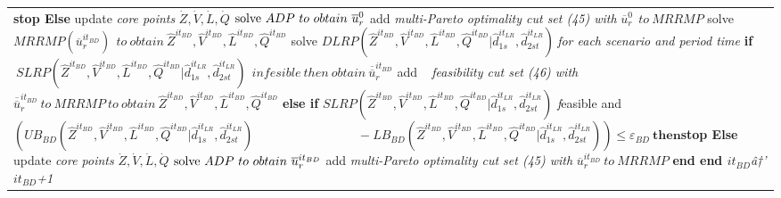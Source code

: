 \documentclass[review]{elsarticle}
\begin{document}
\begin{scriptsize}
\begin{tabular}{p{4.9in}}
 \textbf{         stop\textit{\newline }       Else\newline }          update\textit{ core points }$\dot{Z},\dot{V},\dot{L},\dot{Q}$\newline 
         ${\rm solve}\ ADP\ to\ obtain\ {\overline{u}}^0_r$\textbf{\textit{\newline }}\textit{         }add\textit{ multi-Pareto optimality cut set (45) with }${\overline{u}}^0_r\ \ to\ MRRMP$\newline \textbf{         }solve $MRRMP({\overline{u}}^{{it}_{BD}}_r)\ \ to\ obtain\ {\hat{Z}}^{{it}_{BD}},{\hat{V}}^{it_{BD}},{\hat{L}}^{it_{BD}},{\hat{Q}}^{it_{BD}}$\newline \textbf{         }solve $DLRP\left({\hat{Z}}^{{it}_{BD}},{\hat{V}}^{it_{BD}},{\hat{L}}^{it_{BD}},{\hat{Q}}^{it_{BD}}|{\hat{d}}^{{it}_{LR}}_{1s},{\hat{d}}^{it_{LR}}_{2st}\right)\ $\textit{for each scenario and period time}\newline 
          \textbf{   if} $\ SLRP\left({\hat{Z}}^{{it}_{BD}},{\hat{V}}^{it_{BD}},{\hat{L}}^{it_{BD}},{\hat{Q}}^{it_{BD}}|{\hat{d}}^{{it}_{LR}}_{1s},{\hat{d}}^{it_{LR}}_{2st}\right)\ \ infesible\ then\ obtain\ {\overline{\overline{u}}}^{it_{BD}}_r$
           \newline       
        add \ \textit{ feasibility cut set (46) with }${\overline{\overline{u}}}^{it_{BD}}_r\ to\ MRRMP\ to\ obtain\ {\hat{Z}}^{{it}_{BD}},{\hat{V}}^{it_{BD}},{\hat{L}}^{it_{BD}},{\hat{Q}}^{it_{BD}}$\newline
         \textbf{  else if} $SLRP\left({\hat{Z}}^{{it}_{BD}},{\hat{V}}^{it_{BD}},{\hat{L}}^{it_{BD}},{\hat{Q}}^{it_{BD}}|{\hat{d}}^{{it}_{LR}}_{1s},{\hat{d}}^{it_{LR}}_{2st}\right)$ {\textit feasible and } \newline 
          $\left({UB}_{BD}\left({\hat{Z}}^{{it}_{BD}},{\hat{V}}^{it_{BD}},{\hat{L}}^{it_{BD}},{\hat{Q}}^{it_{BD}}|{\hat{d}}^{{it}_{LR}}_{1s},{\hat{d}}^{it_{LR}}_{2st}\right) \right.$ \newline 
       $\left. \qquad\qquad\qquad\qquad  {-}{LB}_{BD}\left({\hat{Z}}^{{it}_{BD}},{\hat{V}}^{it_{BD}},{\hat{L}}^{it_{BD}},{\hat{Q}}^{it_{BD}}|{\hat{d}}^{{it}_{LR}}_{1s},{\hat{d}}^{it_{LR}}_{2st}\right)\right)\le {\varepsilon }_{BD}\ \mathbf{ then}$\textbf{\newline            stop\textit{\newline }        Else
      	\newline }         
       update\textit{ core points }$\dot{Z},\dot{V},\dot{L},\dot{Q}$\textit{\newline }\textbf{        }${\rm solve}\ ADP\ to\ obtain\ {\overline{u}}^{{it}_{BD}}_r$\textbf{\textit{\newline }}\textit{         }add\textit{ multi-Pareto optimality cut set (45) with }${\overline{u}}^{{it}_{BD}}_r\ to\ MRRMP$\newline \textbf{     end\textit{\newline } end \textit{\newline }}\textit{   }${it}_{BD}$\textit{â†’ }${it}_{BD}$\textit{+1}\newline 
       

\end{tabular}
\end{scriptsize}
\end{document}
